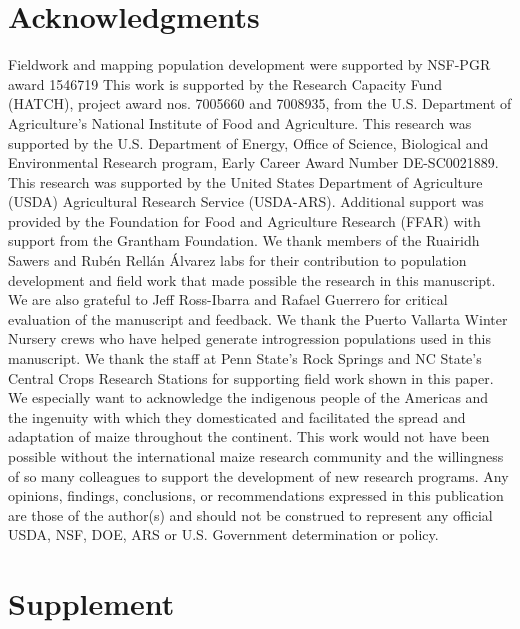 \documentclass[9pt,twocolumn,twoside]{rilabRxiv}
\newcommand{\beginsupplement}{%
  \setcounter{table}{0}
  \renewcommand{\thetable}{S\arabic{table}}%
  \setcounter{figure}{0}
  \renewcommand{\thefigure}{S\arabic{figure}}%
}
\begin{document}
\section{Acknowledgments}
Fieldwork and mapping population development were supported by NSF-PGR award 1546719
This work is supported by the Research Capacity Fund (HATCH), project award nos. 7005660 and 7008935, from the U.S. Department of Agriculture’s National Institute of Food and Agriculture.  
This research was supported by the U.S. Department of Energy, Office of Science, Biological and Environmental Research program, Early Career Award Number DE-SC0021889. 
This research was supported by the United States Department of Agriculture (USDA) Agricultural Research Service (USDA-ARS). Additional support was provided by the Foundation for Food and Agriculture Research (FFAR) with support from the Grantham Foundation.
We thank members of the Ruairidh Sawers and Rubén Rellán Álvarez labs for their contribution to population development and field work that made possible the research in this manuscript.
We are also grateful to Jeff Ross-Ibarra and Rafael Guerrero for critical evaluation of the manuscript and feedback.
We thank the  Puerto Vallarta Winter Nursery crews who have helped generate introgression populations used in this manuscript.
We thank the staff at Penn State's Rock Springs and NC State's Central Crops Research Stations for supporting field work shown in this paper.
We especially want to acknowledge the indigenous people of the Americas and the ingenuity with which they domesticated and facilitated the spread and adaptation of maize throughout the continent.
This work would not have been possible without the international maize research community and the willingness of so many colleagues to support the development of new research programs.
Any opinions, findings, conclusions, or recommendations expressed in this publication are those of the author(s) and should not be construed to represent any official USDA, NSF, DOE, ARS or U.S. Government determination or policy.



\pagebreak
\onecolumn

\section*{Supplement}

\beginsupplement
\end{document}

